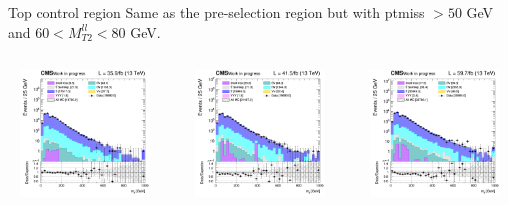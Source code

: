 \documentclass[8pt]{beamer}
\begin{document}
\begin{frame}{Top control region}
\justifying
Same as the pre-selection region but with ptmiss $> 50$ GeV and $60 < M_{T2}^{ll} < 80$ GeV. \vfill

\begin{columns}
		\begin{column}{0.33\textwidth}
			\begin{center}
			\vspace{-8pt}
			\begin{block}{}\end{block}\vspace{5pt}
     			\includegraphics[width=1.0\textwidth, height=95pt]{figs/2016/log_cratio_ttbarCR_ll_mll.png}
    		\end{center}		
		\end{column} 
		\begin{column}{0.33\textwidth}
			\begin{center}
			\vspace{-8pt}
			\begin{block}{}\end{block}\vspace{5pt}
     			\includegraphics[width=1.0\textwidth, height=95pt]{figs/2017/log_cratio_ttbarCR_ll_mll.png}
    		\end{center}		
		\end{column} 
		\begin{column}{0.33\textwidth}
			\begin{center}
			\vspace{-8pt}
			\begin{block}{}\end{block}\vspace{5pt}
     			\includegraphics[width=1.0\textwidth, height=95pt]{figs/2018/log_cratio_ttbarCR_ll_mll.png}
    		\end{center}		
		\end{column}
\end{columns}


\end{frame}
\end{document}
